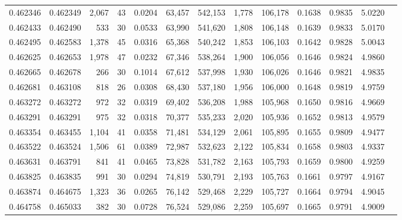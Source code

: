 \begin{tabular}{rrrrrrrrrrrrr}
0.462346 & 0.462349 & 2,067 &    43 &                                     0.0204 &  63,457 & 542,153 &   1,778 & 106,178 & 0.1638 & 0.9835 & 5.0220 \\
0.462433 & 0.462490 &   533 &    30 &                                     0.0533 &  63,990 & 541,620 &   1,808 & 106,148 & 0.1639 & 0.9833 & 5.0170 \\
0.462495 & 0.462583 & 1,378 &    45 &                                     0.0316 &  65,368 & 540,242 &   1,853 & 106,103 & 0.1642 & 0.9828 & 5.0043 \\
0.462625 & 0.462653 & 1,978 &    47 &                                     0.0232 &  67,346 & 538,264 &   1,900 & 106,056 & 0.1646 & 0.9824 & 4.9860 \\
0.462665 & 0.462678 &   266 &    30 &                                     0.1014 &  67,612 & 537,998 &   1,930 & 106,026 & 0.1646 & 0.9821 & 4.9835 \\
0.462681 & 0.463108 &   818 &    26 &                                     0.0308 &  68,430 & 537,180 &   1,956 & 106,000 & 0.1648 & 0.9819 & 4.9759 \\
0.463272 & 0.463272 &   972 &    32 &                                     0.0319 &  69,402 & 536,208 &   1,988 & 105,968 & 0.1650 & 0.9816 & 4.9669 \\
0.463291 & 0.463291 &   975 &    32 &                                     0.0318 &  70,377 & 535,233 &   2,020 & 105,936 & 0.1652 & 0.9813 & 4.9579 \\
0.463354 & 0.463455 & 1,104 &    41 &                                     0.0358 &  71,481 & 534,129 &   2,061 & 105,895 & 0.1655 & 0.9809 & 4.9477 \\
0.463522 & 0.463524 & 1,506 &    61 &                                     0.0389 &  72,987 & 532,623 &   2,122 & 105,834 & 0.1658 & 0.9803 & 4.9337 \\
0.463631 & 0.463791 &   841 &    41 &                                     0.0465 &  73,828 & 531,782 &   2,163 & 105,793 & 0.1659 & 0.9800 & 4.9259 \\
0.463825 & 0.463835 &   991 &    30 &                                     0.0294 &  74,819 & 530,791 &   2,193 & 105,763 & 0.1661 & 0.9797 & 4.9167 \\
0.463874 & 0.464675 & 1,323 &    36 &                                     0.0265 &  76,142 & 529,468 &   2,229 & 105,727 & 0.1664 & 0.9794 & 4.9045 \\
0.464758 & 0.465033 &   382 &    30 &                                     0.0728 &  76,524 & 529,086 &   2,259 & 105,697 & 0.1665 & 0.9791 & 4.9009 \\

\end{tabular}
